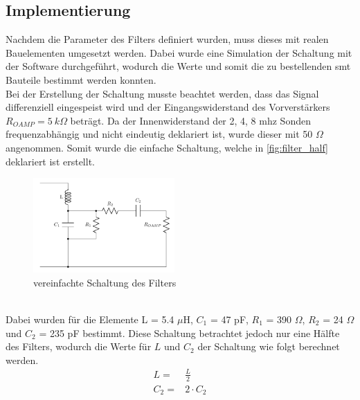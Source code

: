 \subsection*{Implementierung}
Nachdem die Parameter des Filters definiert wurden, muss dieses mit realen Bauelementen umgesetzt werden. Dabei wurde eine Simulation der Schaltung mit der Software  durchgeführt, wodurch die Werte und somit die zu bestellenden \ac{smt} Bauteile bestimmt werden konnten.\\
Bei der Erstellung der Schaltung musste beachtet werden, dass das Signal differenziell eingespeist wird und der Eingangswiderstand des Vorverstärkers $R_{OAMP}=5\ k\Omega$ beträgt. Da der Innenwiderstand der 2, 4, 8 \ac{mhz} Sonden frequenzabhängig und nicht eindeutig deklariert ist, wurde dieser mit 50 $\Omega$ angenommen. Somit wurde die einfache Schaltung, welche in \autoref{fig:filter_half} deklariert ist erstellt.
\begin{figure}[!h]
	\centering
   	\includegraphics[width=0.48\textwidth]{images/Bandpass/half}
    \caption{vereinfachte Schaltung des Filters}
    \label{fig:filter_half}
\end{figure}\\
Dabei wurden für die Elemente L = 5.4 $\mu$H, $C_1$ = 47 pF, $R_1$ = 390 $\Omega$, $R_2$ = 24 $\Omega$ und $C_2$ = 235 pF bestimmt.
Diese Schaltung betrachtet jedoch nur eine Hälfte des Filters, wodurch die Werte für $L$ und $C_2$ der Schaltung wie folgt berechnet werden.
\begin{align*}
L=&\frac{L}{2}\\
C_2=&2\cdot C_2
\end{align*}
\clearpage
